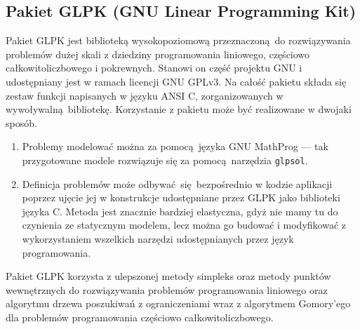 \subsection{Pakiet GLPK (GNU Linear Programming Kit)} %
\label{ss_internals_glpk}
\par{
  Pakiet GLPK jest biblioteką wysokopoziomową przeznaczoną do rozwiązywania problemów dużej skali z dziedziny programowania liniowego, częściowo całkowitoliczbowego i pokrewnych.
  Stanowi on część projektu GNU i udostępniany jest w ramach licencji GNU GPLv3.
  Na całość pakietu składa się zestaw funkcji napisanych w języku ANSI C, zorganizowanych w wywoływalną bibliotekę.
  Korzystanie z pakietu może być realizowane w dwojaki sposób.
  \begin{enumerate}
    \item Problemy modelować można za pomocą języka GNU MathProg --- tak przygotowane modele rozwiązuje się za pomocą narzędzia \texttt{glpsol}.
    \item Definicja problemów może odbywać się bezpośrednio w kodzie aplikacji poprzez ujęcie jej w konstrukcje udostępniane przez GLPK jako biblioteki języka C. Metoda jest znacznie bardziej elastyczna, gdyż nie mamy tu do czynienia ze statycznym modelem, lecz można go budować i modyfikować z wykorzystaniem wszelkich narzędzi udostępnianych przez język programowania.
  \end{enumerate}
}
\par{
  Pakiet GLPK korzysta z ulepszonej metody simpleks oraz metody punktów wewnętrznych do rozwiązywania problemów programowania liniowego oraz algorytmu drzewa poszukiwań z ograniczeniami wraz z algorytmem Gomory'ego dla problemów programowania częściowo całkowitoliczbowego.
}
